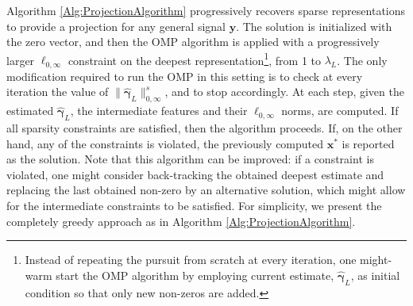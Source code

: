 \documentclass[10pt,journal]{IEEEtran}
\def\x{{\mathbf x}}
\def\y{{\mathbf y}}
\def\D{{\mathbf D}}
\def\M{{\mathcal{M}}}
\def\P{{\mathcal{P}}}
\def\gama{{\boldsymbol \gamma}}
\def\lamda{{\boldsymbol \lambda}}
\def\PM{{\P_{\M_\lamda}}}
\theoremstyle{plain}
\theoremstyle{definition}
\begin{document}
Algorithm \ref{Alg:ProjectionAlgorithm} progressively recovers sparse representations to provide a projection for any general signal $\y$. The solution is initialized with the zero vector, and then the OMP algorithm is applied with a progressively larger $\ell_{0,\infty}$ constraint on the deepest representation\footnote{Instead of repeating the pursuit from scratch at every iteration, one might-warm start the OMP algorithm by employing current estimate, $\hat{\gama}_L$, as initial condition so that only new non-zeros are added.}, from 1 to $\lambda_L$. The only modification required to run the OMP in this setting is to check at every iteration the value of $\|\hat{\gama}_L\|^s_{0,\infty}$, and to stop accordingly. At each step, given the estimated $\hat{\gama}_L$, the intermediate features and their $\ell_{0,\infty}$ norms, are computed. If all sparsity constraints are satisfied, then the algorithm proceeds. If, on the other hand, any of the constraints is violated, the previously computed $\x^\ast$ is reported as the solution. Note that this algorithm can be improved: if a constraint is violated, one might consider back-tracking the obtained deepest estimate and replacing the last obtained non-zero by an alternative solution, which might allow for the intermediate constraints to be satisfied. For simplicity, we present the completely greedy approach as in Algorithm \ref{Alg:ProjectionAlgorithm}.

\end{document}
